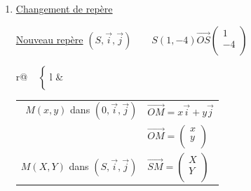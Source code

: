 \begin{enumerate}
\renewcommand{\theenumi}{\alph{enumi})}
\item \underline{Changement de repère}


\underline{Nouveau repère} $(S, \vec{i}, \vec{j}) 
               \qquad S(1, -4) \overrightarrow{OS}\left(\begin{array}{c}
                                                          1\\
                                                         -4\\
                                                   \end{array}\right)$ \\
                                    
\begin{tabular}{r@{$\left.\begin{array}{c}  \\ \\ \\ \\ 
                               \end{array} \right\lbrace $}l}
 & \begin{tabular}{r@{$\Longleftrightarrow$}l}
    $M(x,y)$ dans $(0, \vec{i}, \vec{j}) $ 
          & $ \overrightarrow{OM} = x\vec{i} +y\vec{j} $ \\
          & $ \overrightarrow{OM} =\left(\begin{array}{c}
                                            x\\
                                            y\\
                                   \end{array}\right)$ \\
   $M(X,Y)$ dans $(S, \vec{i}, \vec{j}) $ 
          & $ \overrightarrow{SM} =\left(\begin{array}{c}
                                            X\\
                                            Y\\
                                   \end{array}\right)$ \\                                   
   \end{tabular}\\
\end{tabular}                                                   



\end{enumerate}
